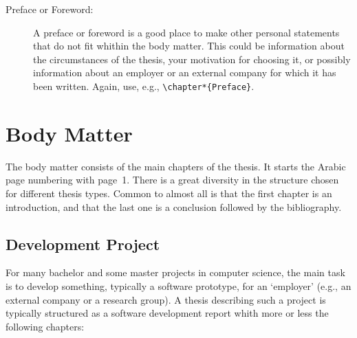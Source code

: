 \begin{description}
    \item[Preface or Foreword:] A preface or foreword is a good place to make other personal statements that do not fit whithin the body matter. This could be information about the circumstances of the thesis, your motivation for choosing it, or possibly information about an employer or an external company for which it has been written. Again, use, e.g., \texttt{\textbackslash chapter*\{Preface\}}.
\end{description}

\section{Body Matter}

The body matter consists of the main chapters of the thesis. It starts the Arabic page numbering with page~1. There is a great diversity in the structure chosen for different thesis types. Common to almost all is that the first chapter is an introduction, and that the last one is a conclusion followed by the bibliography.

\subsection{Development Project}
\label{sec:development}

For many bachelor and some master projects in computer science, the main task is to develop something, typically a software prototype, for an `employer' (e.g., an external company or a research group). A thesis describing such a project is typically structured as a software development report whith more or less the following chapters:

